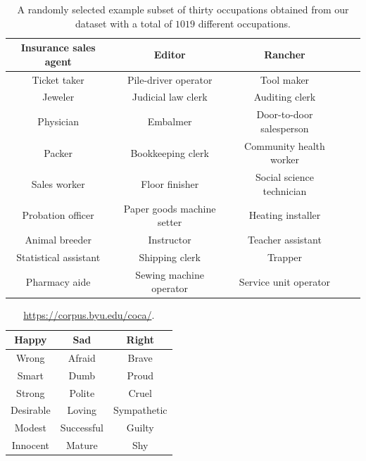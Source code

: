 \documentclass[fleqn,10pt]{article}
\begin{document}
\begin{table}[H]
\centering
\small{
	\begin{tabular}{|c|c|c|c|c|}
	\hline
	Insurance sales agent 	& Editor 						& Rancher 					\\ \hline
	Ticket taker 			& Pile-driver operator 			& Tool maker 				\\ \hline
	Jeweler 				& Judicial law clerk 			& Auditing clerk 			\\ \hline
	Physician 				& Embalmer 						& Door-to-door salesperson 	\\ \hline
	Packer 					& Bookkeeping clerk 			& Community health worker 	\\ \hline
	Sales worker 			& Floor finisher 				& Social science technician \\ \hline
	Probation officer 		& Paper goods machine setter 	& Heating installer 		\\ \hline
	Animal breeder 			& Instructor 					& Teacher assistant 		\\ \hline
	Statistical assistant 	& Shipping clerk 				& Trapper 					\\ \hline
	Pharmacy aide 			& Sewing machine operator 		& Service unit operator 	\\ \hline
	\end{tabular}
	}
    \caption{A randomly selected example subset of thirty occupations obtained from our dataset with a total of $1019$ different occupations.}
	\label{tab:occupations-examples}
\end{table}

\begin{table}[H]
\centering
\small{
	\begin{tabular}{|c|c|c|}
	\hline
	Happy 		& Sad 		 & Right 		\\ \hline
	Wrong 		& Afraid	 & Brave 		\\ \hline
	Smart		& Dumb		 & Proud 		\\ \hline
	Strong		& Polite	 & Cruel 		\\ \hline
	Desirable	& Loving	 & Sympathetic 	\\ \hline
	Modest 		& Successful & Guilty		\\ \hline
	Innocent	& Mature	 & Shy			\\ \hline
	\end{tabular}
	}
    \caption{ \url{https://corpus.byu.edu/coca/}.}
	\label{tab:adjectives}
\end{table}
\end{document}
